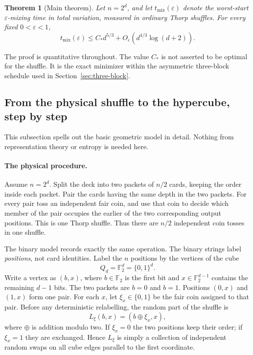 \documentclass[11pt]{article}
\numberwithin{equation}{section}
\newtheorem{theorem}{Theorem}[section]
\theoremstyle{definition}\newtheorem{definition}[theorem]{Definition}
\theoremstyle{remark}\newtheorem{remark}[theorem]{Remark}
\newcommand{\mix}{\mathrm{mix}}
\newcommand{\Ftwo}{\mathbb F_2}
\begin{document}
\begin{theorem}[Main theorem]\label{thm:main-intro}
Let $n=2^d$, and let $t_{\mix}(\varepsilon)$ denote the worst-start
$\varepsilon$-mixing time in total variation, measured in ordinary Thorp
shuffles.  For every fixed $0<\varepsilon<1$,
\begin{equation}\label{eq:main-intro}
 t_{\mix}(\varepsilon)
 \le C_*d^{5/3}+O_\varepsilon\!\left(d^{4/3}\log(d+2)\right).
\end{equation}
\end{theorem}

The proof is quantitative throughout.  The value $C_*$ is not asserted to be
optimal for the shuffle.  It is the exact minimizer within the asymmetric
three-block schedule used in Section~\ref{sec:three-block}.

\subsection{From the physical shuffle to the hypercube, step by step}
\label{subsec:clock}
This subsection spells out the basic geometric model in detail.  Nothing from
representation theory or entropy is needed here.

\paragraph{The physical procedure.}
Assume $n=2^d$.  Split the deck into two packets of $n/2$ cards, keeping the
order inside each packet.  Pair the cards having the same depth in the two
packets.  For every pair toss an independent fair coin, and use that coin to
decide which member of the pair occupies the earlier of the two corresponding
output positions.  This is one Thorp shuffle.  Thus there are $n/2$ independent
coin tosses in one shuffle.

The binary model records exactly the same operation.  The binary strings label
\emph{positions}, not card identities.  Label the $n$ positions by the vertices
of the cube
\[
 Q_d=\Ftwo^d=\{0,1\}^d.
\]
Write a vertex as $(b,x)$, where $b\in\Ftwo$ is the first bit and
$x\in\Ftwo^{d-1}$ contains the remaining $d-1$ bits.  The two packets are
$b=0$ and $b=1$.  Positions $(0,x)$ and $(1,x)$ form one pair.
For each $x$, let $\xi_x\in\{0,1\}$ be the fair coin assigned to that pair.
Before any deterministic relabelling, the random part of the shuffle is
\begin{equation}\label{eq:first-layer}
 L_\xi(b,x)=(b\oplus\xi_x,x),
\end{equation}
where $\oplus$ is addition modulo two.  If $\xi_x=0$ the two positions keep
their order; if $\xi_x=1$ they are exchanged.  Hence $L_\xi$ is simply a
collection of independent random swaps on all cube edges parallel to the first
coordinate.
\end{document}
